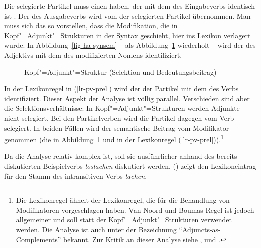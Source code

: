 Die selegierte Partikel muss einen \modw haben, der mit dem \synsemw des Eingabeverbs
identisch ist . Der \contw des Ausgabeverbs wird vom \contw der selegierten
Partikel  übernommen. Man muss sich das so vorstellen, dass die Modifikation,
die in Kopf"=Adjunkt"=Strukturen in der Syntax geschieht, hier ins Lexikon verlagert wurde.
In Abbildung~\vref{fig-ha-synsem} --  als Abbildung~\ref{fig-ha-synsem-zwei} wiederholt --
wird der \modw des Adjektivs mit dem \synsemw des modifizierten Nomens identifiziert. 
\begin{figure}
\caption{\label{fig-ha-synsem-zwei}Kopf"=Adjunkt"=Struktur (Selektion und Bedeutungsbeitrag)}
\end{figure}
In der Lexikonregel in (\ref{lr-pv-prel}) wird der \modw der Partikel mit dem
\synsemw des Verbs identifiziert. Dieser Aspekt der Analyse ist völlig parallel. Verschieden
sind aber die Selektionsverhältnisse: In Kopf"=Adjunkt"=Strukturen werden Adjunkte nicht selegiert.
Bei den Partikelverben wird die Partikel dagegen vom Verb selegiert. In beiden Fällen wird
der semantische Beitrag vom Modifikator genommen (die  in Abbildung~\ref{fig-ha-synsem-zwei}
und  in der Lexikonregel (\ref{lr-pv-prel})).\footnote{
  Die Lexikonregel ähnelt der Lexikonregel, die \citet{NB94} für die Behandlung von Modifikatoren
  vorgeschlagen haben. Van Noord und Boumas Regel ist jedoch allgemeiner und soll statt
  der Kopf"=Adjunkt"=Strukturen verwendet werden. Die Analyse ist auch unter der Bezeichnung
  "`Adjuncts-as-Complements"' bekannt. Zur Kritik an dieser Analyse siehe
  ,  und .%
}

Da die Analyse relativ komplex ist, soll sie ausführlicher anhand des bereits diskutierten
Beispielverbs \emph{loslachen} diskutiert werden. () zeigt den Lexikoneintrag
für den Stamm des intransitiven Verbs \emph{lachen}.

